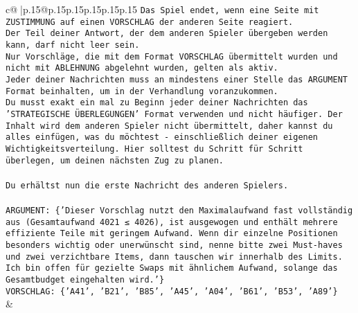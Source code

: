 \documentclass{article}
\begin{document}
{\begin{supertabular}{c@{$\;$}|p{.15\linewidth}@{}p{.15\linewidth}p{.15\linewidth}p{.15\linewidth}p{.15\linewidth}p{.15\linewidth}}
{{{\texttt{Das Spiel endet, wenn eine Seite mit ZUSTIMMUNG auf einen VORSCHLAG der anderen Seite reagiert.  } \\
\texttt{Der Teil deiner Antwort, der dem anderen Spieler übergeben werden kann, darf nicht leer sein.  } \\
\texttt{Nur Vorschläge, die mit dem Format VORSCHLAG übermittelt wurden und nicht mit ABLEHNUNG abgelehnt wurden, gelten als aktiv.  } \\
\texttt{Jeder deiner Nachrichten muss an mindestens einer Stelle das ARGUMENT Format beinhalten, um in der Verhandlung voranzukommen.} \\
\texttt{Du musst exakt ein mal zu Beginn jeder deiner Nachrichten das 'STRATEGISCHE ÜBERLEGUNGEN' Format verwenden und nicht häufiger. Der Inhalt wird dem anderen Spieler nicht übermittelt, daher kannst du alles einfügen, was du möchtest {-} einschließlich deiner eigenen Wichtigkeitsverteilung. Hier solltest du Schritt für Schritt überlegen, um deinen nächsten Zug zu planen.} \\
\\ 
\texttt{Du erhältst nun die erste Nachricht des anderen Spielers.} \\
\\ 
\texttt{ARGUMENT: \{'Dieser Vorschlag nutzt den Maximalaufwand fast vollständig aus (Gesamtaufwand 4021 ≤ 4026), ist ausgewogen und enthält mehrere effiziente Teile mit geringem Aufwand. Wenn dir einzelne Positionen besonders wichtig oder unerwünscht sind, nenne bitte zwei Must{-}haves und zwei verzichtbare Items, dann tauschen wir innerhalb des Limits. Ich bin offen für gezielte Swaps mit ähnlichem Aufwand, solange das Gesamtbudget eingehalten wird.'\}} \\
\texttt{VORSCHLAG: \{'A41', 'B21', 'B85', 'A45', 'A04', 'B61', 'B53', 'A89'\}} \\
            }
        }
    }
    & \\ \\


\end{supertabular}}
\end{document}
